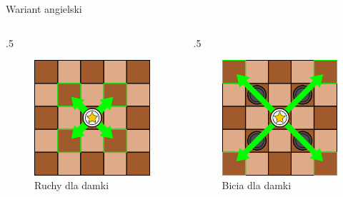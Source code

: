 \begin{frame}{Wariant angielski}
	\begin{columns}
		\begin{column}{.5\hsize}
			{\centering
			\begin{figure}
				\includegraphics[scale=.25]{figures/warcaby_ruchyDamkaZwykle.png}
				\caption{Ruchy dla damki}
			\end{figure}
			}
		\end{column}
		\begin{column}{.5\hsize}
			{\centering
			\begin{figure}
				\includegraphics[scale=.25]{figures/warcaby_ruchyDamkaBicia.png}
				\caption{Bicia dla damki}
			\end{figure}
			}
		\end{column}
	\end{columns}

		

\end{frame}
